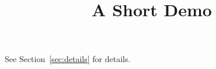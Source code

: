 \documentclass[article]{jss}
\title{A Short Demo}
\begin{document}
See Section~\ref{sec:details} for details.
\end{document}
